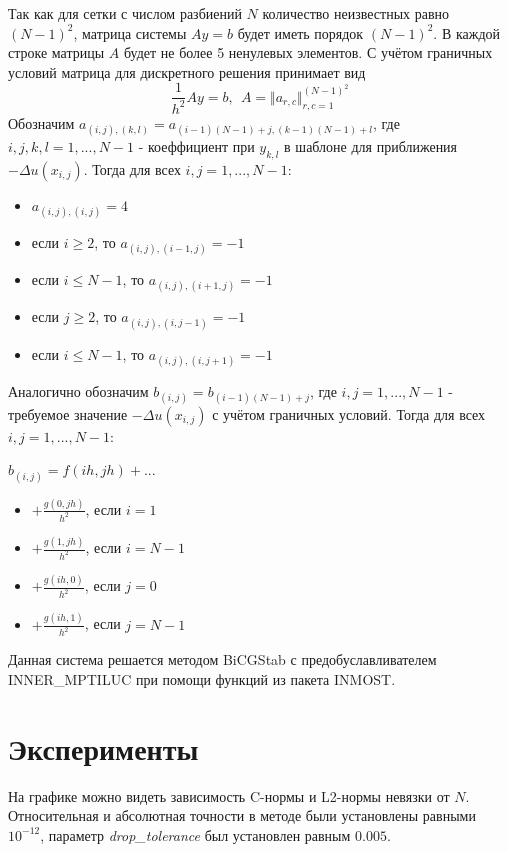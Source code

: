 \documentclass{article}
\begin{document}
Так как для сетки с числом разбиений $N$ количество неизвестных равно $(N - 1)^2$, матрица системы $Ay = b$ будет иметь порядок $(N - 1)^2$. В каждой строке матрицы $A$ будет не более 5 ненулевых элементов.
С учётом граничных условий матрица для дискретного решения принимает вид
$$\frac{1}{h^2}Ay = b, \ \ A = \Vert a_{r,c} \Vert_{r, c = 1}^{(N-1)^2}$$
Обозначим $a_{(i, j), (k, l)} = a_{(i-1)(N-1)+j, (k-1)(N-1) + l}$, где $i, j, k, l = 1, ... , N-1$ - коеффициент при $y_{k, l}$ в шаблоне для приближения $-\Delta u(x_{i, j})$.
Тогда для всех $i, j = 1, ... , N-1$:
\begin{itemize}
  \item $a_{(i, j), (i, j)} = 4$
  \item если $i \ge 2$, то $a_{(i, j), (i - 1, j)} = -1$
  \item если $i \le N - 1$, то $a_{(i, j), (i + 1, j)} = -1$
  \item если $j \ge 2$, то $a_{(i, j), (i, j - 1)} = -1$
  \item если $i \le N - 1$, то $a_{(i, j), (i, j + 1)} = -1$
\end{itemize}

Аналогично обозначим $b_{(i, j)} = b_{(i - 1)(N-1) + j}$, где $i, j = 1, ... , N-1$ - требуемое значение $-\Delta u(x_{i, j})$ с учётом граничных условий.
Тогда для всех $i, j = 1, ... , N-1$:

$b_{(i, j)} = f(ih, jh) + ...$
\begin{itemize}
  \item $+ \frac{g(0, jh)}{h^2}$, если $i = 1$
  \item $+ \frac{g(1, jh)}{h^2}$, если $i = N-1$
  \item $+ \frac{g(ih, 0)}{h^2}$, если $j = 0$
  \item $+ \frac{g(ih, 1)}{h^2}$, если $j = N-1$
\end{itemize}

Данная система решается методом BiCGStab с предобуславливателем INNER\_MPTILUC при помощи функций из пакета INMOST.

\section{Эксперименты}

На графике можно видеть зависимость C-нормы и L2-нормы невязки от $N$. Относительная и абсолютная точности в методе были установлены равными $10^{-12}$, параметр \textit{drop\_tolerance} был установлен равным $0.005$.
\end{document}
